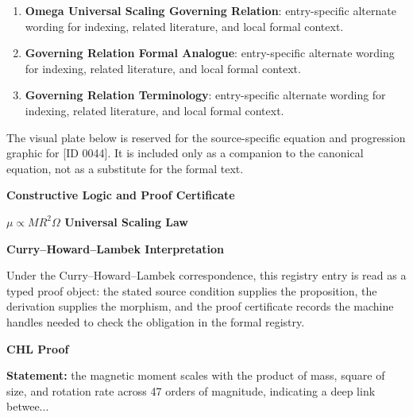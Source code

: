 \begingroup\footnotesize\sloppy
\begin{enumerate}[leftmargin=1.35em,itemsep=1pt,topsep=1pt,parsep=0pt]
\item \textbf{Omega Universal Scaling Governing Relation}: entry-specific alternate wording for indexing, related literature, and local formal context.
\item \textbf{Governing Relation Formal Analogue}: entry-specific alternate wording for indexing, related literature, and local formal context.
\item \textbf{Governing Relation Terminology}: entry-specific alternate wording for indexing, related literature, and local formal context.
\end{enumerate}
\endgroup

\begingroup\footnotesize\sloppy
The visual plate below is reserved for the source-specific equation and progression graphic for [ID 0044]. It is included only as a companion to the canonical equation, not as a substitute for the formal text.
\par\endgroup
\ifTZPDarkEdition
{}
\fi

\clearpage
\begingroup\tzpsupportsetup
\noindent\textbf{\fontsize{10.8pt}{12.8pt}\selectfont [ID 0044] Constructive Logic and Proof Certificate}\par
\noindent\textbf{\fontsize{10pt}{12pt}\selectfont \texorpdfstring{\(\mu \propto M R^{2}\Omega\)}{mu proportional to MR^2 Omega} Universal Scaling Law}\par
\vspace{0.45em}
\begingroup
\footnotesize
\setlength{\parskip}{0.22em}
\setlength{\parindent}{0pt}
\noindent\textbf{Curry--Howard--Lambek Interpretation}\par
Under the Curry--Howard--Lambek correspondence, this registry entry is read as a typed proof
object: the stated source condition supplies the proposition, the derivation supplies the
morphism, and the proof certificate records the machine handles needed to check the obligation
in the formal registry.

\vspace{0.45em}
\noindent\textbf{CHL Proof}\par
\textbf{Statement:} the magnetic moment scales with the product of mass, square of size, and rotation rate
across 47 orders of magnitude, indicating a deep link betwee...

